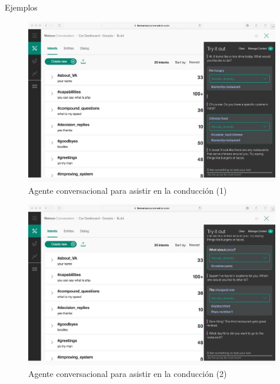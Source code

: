 \documentclass[compress]{beamer}
\begin{document}
\begin{frame}{Ejemplos}
	\begin{figure}[H]
		\centering
		\label{car1.jpg}
		\includegraphics[width=0.99\textwidth]{./Imagenes/car1.jpeg}
		\caption{Agente conversacional para asistir en la conducción (1)}
	\end{figure}
\end{frame}

\begin{frame}
	\begin{figure}[H]
		\centering
		\label{car2.jpg}
		\includegraphics[width=0.99\textwidth]{./Imagenes/car2.jpeg}
		\caption{Agente conversacional para asistir en la conducción (2)}
	\end{figure}
\end{frame}
\end{document}
